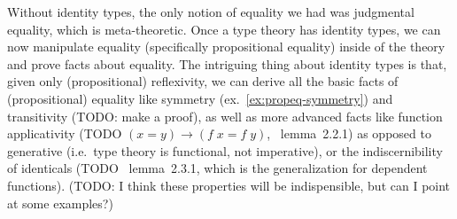 \documentclass[11pt]{article} %
\theoremstyle{definition}
\theoremstyle{remark}
\begin{document}
Without identity types, the only notion of equality we had was judgmental equality, which is meta-theoretic.
Once a type theory has identity types, we can now manipulate equality (specifically propositional equality) inside of the theory and prove facts about equality.
The intriguing thing about identity types is that, given only (propositional) reflexivity, we can derive all the basic facts of (propositional) equality like symmetry (ex.~\ref{ex:propeq-symmetry}) and transitivity (TODO: make a proof), as well as more advanced facts like function applicativity (TODO $(x = y) \to (f\;x = f\;y)$, \cite{hottbook}~lemma~2.2.1) as opposed to generative (i.e.\ type theory is functional, not imperative), or the indiscernibility of identicals (TODO \cite{hottbook}~lemma~2.3.1, which is the generalization for dependent functions).
(TODO: I think these properties will be indispensible, but can I point at some examples?)
\end{document}
